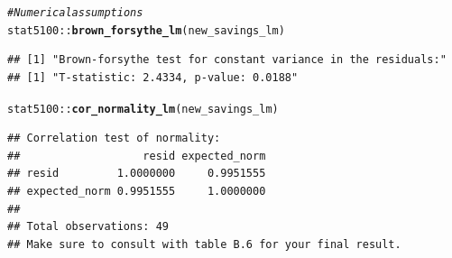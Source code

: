 \documentclass{article}\usepackage[]{graphicx}\usepackage[]{color}
\makeatletter
\newcommand{\hlcom}[1]{\textcolor[rgb]{0.678,0.584,0.686}{\textit{#1}}}%
\newcommand{\hlopt}[1]{\textcolor[rgb]{0,0,0}{#1}}%
\newcommand{\hlstd}[1]{\textcolor[rgb]{0.345,0.345,0.345}{#1}}%
\newcommand{\hlkwd}[1]{\textcolor[rgb]{0.737,0.353,0.396}{\textbf{#1}}}%
\newenvironment{kframe}{%
 \def\at@end@of@kframe{}%
 \ifinner\ifhmode%
  \def\at@end@of@kframe{\end{minipage}}%
  \begin{minipage}{\columnwidth}%
 \fi\fi%
 \def\FrameCommand##1{\hskip\@totalleftmargin \hskip-\fboxsep
 \colorbox{shadecolor}{##1}\hskip-\fboxsep
     \hskip-\linewidth \hskip-\@totalleftmargin \hskip\columnwidth}%
 \MakeFramed {\advance\hsize-\width
   \@totalleftmargin\z@ \linewidth\hsize
   \@setminipage}}%
 {\par\unskip\endMakeFramed%
 \at@end@of@kframe}
\newenvironment{knitrout}{}{} %
\makeatother
\begin{document}
\begin{knitrout}
{}



\end{knitrout}

\begin{knitrout}
\color{fgcolor}\begin{kframe}
\begin{alltt}
\hlcom{# Numerical assumptions}
\hlstd{stat5100}\hlopt{::}\hlkwd{brown_forsythe_lm}\hlstd{(new_savings_lm)}
\end{alltt}
\begin{verbatim}
## [1] "Brown-forsythe test for constant variance in the residuals:"
## [1] "T-statistic: 2.4334, p-value: 0.0188"
\end{verbatim}
\begin{alltt}
\hlstd{stat5100}\hlopt{::}\hlkwd{cor_normality_lm}\hlstd{(new_savings_lm)}
\end{alltt}
\begin{verbatim}
## Correlation test of normality:
##                   resid expected_norm
## resid         1.0000000     0.9951555
## expected_norm 0.9951555     1.0000000
## 
## Total observations: 49
## Make sure to consult with table B.6 for your final result.
\end{verbatim}
\end{kframe}
\end{knitrout}

\newpage
\end{document}
